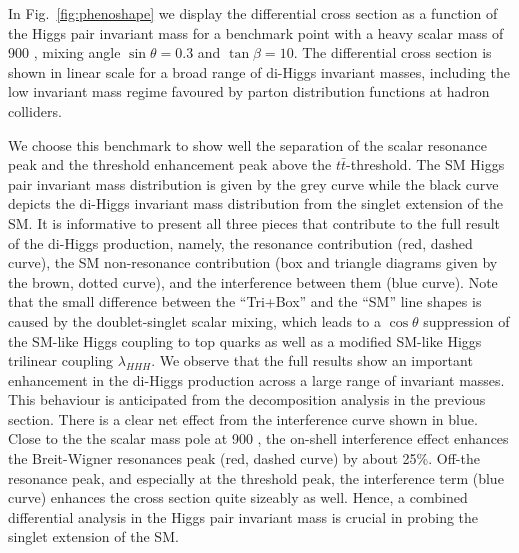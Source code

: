 In Fig.~\ref{fig:phenoshape} we display the differential cross section as a function of the Higgs pair invariant mass for a benchmark point with a heavy scalar mass of 900 \UGeV, mixing angle $\sin\theta=0.3$ and $\tan\beta=10$. 
The differential cross section is shown in linear scale for a broad range of di-Higgs invariant masses,  including the low invariant mass regime favoured by parton distribution functions at hadron colliders.

We choose this benchmark to show well the separation of the scalar resonance peak and the threshold enhancement peak above the $t\bar t$-threshold. The SM Higgs pair invariant mass distribution is given by the  grey curve while the black curve depicts the di-Higgs invariant mass distribution from the singlet extension of the SM. 
It is informative to present all three pieces that contribute to the full result of the di-Higgs production, namely, the resonance contribution (red, dashed curve), the SM non-resonance contribution (box and triangle diagrams given by the brown, dotted curve), and the interference between them (blue curve). 
Note that the small difference between the ``Tri+Box'' and the ``SM'' line shapes is caused by the doublet-singlet scalar mixing, which leads to a $\cos\theta$ suppression of the SM-like Higgs coupling to top quarks as well as a modified SM-like Higgs trilinear coupling $\lambda_{HHH}$.
We observe that the full results show an important enhancement in the di-Higgs production across a  large range of invariant masses. This behaviour is anticipated from the decomposition analysis in the previous section. There is a clear net effect from  the interference curve shown in blue.  Close to the the scalar mass pole at 900 \UGeV, the on-shell interference effect enhances the Breit-Wigner resonances peak (red, dashed curve) by about 25\%. Off-the resonance peak, and especially at the threshold peak, the interference term (blue curve) enhances the cross section quite sizeably as well. Hence, a combined differential analysis in the Higgs pair invariant mass is crucial in probing the singlet extension of the SM. 


